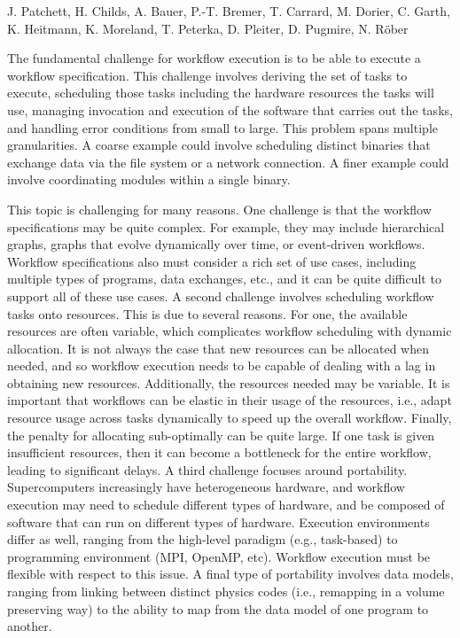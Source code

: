 \license

 J. Patchett, H. Childs, A. Bauer, P.-T. Bremer, T. Carrard, M. Dorier, C. Garth, K. Heitmann, K. Moreland, T. Peterka, D. Pleiter, D. Pugmire, N. Röber

\begin{refsection}

The fundamental challenge for workflow execution is to be able to execute a workflow specification.  This challenge involves deriving the set of tasks to execute, scheduling those tasks including the hardware resources the tasks will use, managing invocation and execution of the software that carries out the tasks, and handling error conditions from small to large.
This problem spans multiple granularities.  A coarse example could involve scheduling distinct binaries that exchange data via the file system or a network connection.  A finer example could involve coordinating modules within a single binary.

This topic is challenging for many reasons.
One challenge is that the workflow specifications may be quite complex.  For example, they may include hierarchical graphs, graphs that evolve dynamically over time, or event-driven workflows.  Workflow specifications also must consider a rich set of use cases, including multiple types of programs, data exchanges, etc., and it can be quite difficult to support all of these use cases.
A second challenge involves scheduling workflow tasks onto resources.  This is due to several reasons. For one, the available resources are often variable, which complicates workflow scheduling with dynamic allocation.  It is not always the case that new resources can be allocated when needed, and so workflow execution needs to be capable of dealing with a lag in obtaining new resources.  Additionally, the resources needed may be variable.  It is important that workflows can be elastic in their usage of the resources, i.e., adapt resource usage across tasks dynamically to speed up the overall workflow.  Finally, the penalty for allocating sub-optimally can be quite large.  If one task is given insufficient resources, then it can become a bottleneck for the entire workflow, leading to significant delays.
A third challenge focuses around portability.  Supercomputers increasingly have heterogeneous hardware, and workflow execution may need to schedule different types of hardware, and be composed of software that can run on different types of hardware.  Execution environments differ as well, ranging from the high-level paradigm (e.g., task-based) to programming environment (MPI, OpenMP, etc).  Workflow execution must be flexible with respect
to this issue.  A final type of portability involves data models, ranging from linking between distinct physics codes (i.e., remapping in a volume preserving way) to the ability to map from the data model of one program to another.


\end{refsection}
